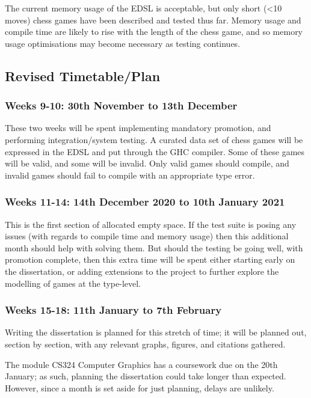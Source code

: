 \documentclass[12pt, a4paper]{scrartcl}
\begin{document}
The current memory usage of the EDSL is acceptable, but only short (<10 moves) chess games have been described and tested thus far. Memory usage and compile time are likely to rise with the length of the chess game, and so memory usage optimisations may become necessary as testing continues.

\subsection{Revised Timetable/Plan}

\subsubsection{Weeks 9-10: 30th November to 13th December}

These two weeks will be spent implementing mandatory promotion, and performing integration/system testing. A curated data set of chess games will be expressed in the EDSL and put through the GHC compiler. Some of these games will be valid, and some will be invalid. Only valid games should compile, and invalid games should fail to compile with an appropriate type error.

\subsubsection{Weeks 11-14: 14th December 2020 to 10th January 2021}

This is the first section of allocated empty space. If the test suite is posing any issues (with regards to compile time and memory usage) then this additional month should help with solving them. But should the testing be going well, with promotion complete, then this extra time will be spent either starting early on the dissertation, or adding extensions to the project to further explore the modelling of games at the type-level.

\subsubsection{Weeks 15-18: 11th January to 7th February}

Writing the dissertation is planned for this stretch of time; it will be planned out, section by section, with any relevant graphs, figures, and citations gathered.

The module CS324 Computer Graphics has a coursework due on the 20th January; as such, planning the dissertation could take longer than expected. However, since a month is set aside for just planning, delays are unlikely.
\end{document}
